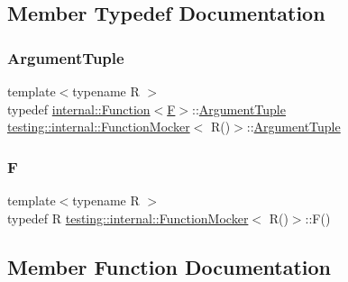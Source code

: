 \subsection{Member Typedef Documentation}
\mbox{\label{classtesting_1_1internal_1_1FunctionMocker_3_01R_07_08_4_a5a279e0d8414bf0809405c06a0725b66}} 
\subsubsection{\texorpdfstring{ArgumentTuple}{ArgumentTuple}}
{\footnotesize\ttfamily template$<$typename R $>$ \\
typedef \mbox{\hyperlink{structtesting_1_1internal_1_1Function}{internal\+::\+Function}}$<$\mbox{\hyperlink{classtesting_1_1internal_1_1FunctionMocker_3_01R_07_08_4_a2c1d7da413176d87405227df90a95521}{F}}$>$\+::\mbox{\hyperlink{classtesting_1_1internal_1_1FunctionMocker_3_01R_07_08_4_a5a279e0d8414bf0809405c06a0725b66}{Argument\+Tuple}} \mbox{\hyperlink{classtesting_1_1internal_1_1FunctionMocker}{testing\+::internal\+::\+Function\+Mocker}}$<$ R()$>$\+::\mbox{\hyperlink{classtesting_1_1internal_1_1FunctionMocker_3_01R_07_08_4_a5a279e0d8414bf0809405c06a0725b66}{Argument\+Tuple}}}

\mbox{\label{classtesting_1_1internal_1_1FunctionMocker_3_01R_07_08_4_a2c1d7da413176d87405227df90a95521}} 
\subsubsection{\texorpdfstring{F}{F}}
{\footnotesize\ttfamily template$<$typename R $>$ \\
typedef R \mbox{\hyperlink{classtesting_1_1internal_1_1FunctionMocker}{testing\+::internal\+::\+Function\+Mocker}}$<$ R()$>$\+::F()}



\subsection{Member Function Documentation}
\mbox{\label{classtesting_1_1internal_1_1FunctionMocker_3_01R_07_08_4_a8096a10aea2ffc6a78d0437855d2ef10}} 
